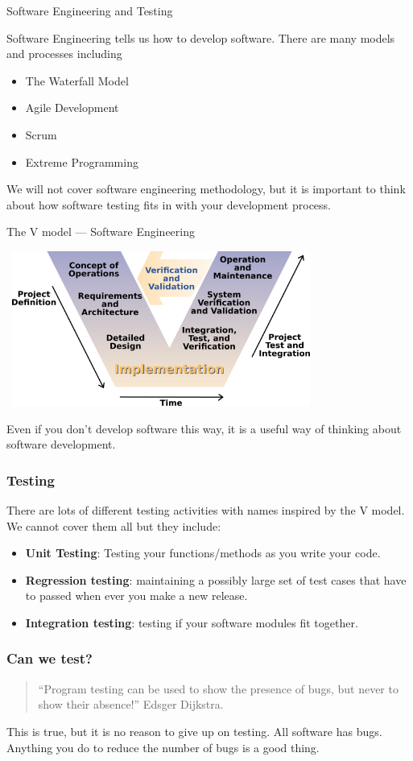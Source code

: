 \documentclass{beamer}
\newcommand{\recordingpause}{
\begin{frame}{Recording Pause}
  \begin{center}
    Recording Pause
  \end{center}
\end{frame}
}
\renewcommand{\recordingpause}{}
\begin{document}
\recordingpause

\begin{frame}{Software Engineering and Testing}

Software Engineering tells us how to develop software. There are many
models and processes including
\begin{itemize}
\item The Waterfall Model
\item Agile Development
\item Scrum
\item Extreme Programming 
\end{itemize}
 We will not cover software engineering methodology, but it is
 important to think about how software testing fits in with your
 development process. 
\end{frame}
\begin{frame}{The V model --- Software Engineering}

\begin{center} 
 \includegraphics[height=2in,width=4in]{V_model.png}
\end{center}
Even if you don't develop software this way, it is a useful way of
thinking about software development.
\end{frame}

\begin{frame}
  \frametitle{Testing}

  There are lots of different testing activities with names inspired
  by the V model.  We cannot cover them all but they include:
  \begin{itemize}
  \item \textbf{Unit Testing}: Testing your functions/methods as you write your
    code.
  \item \textbf{Regression testing}: maintaining a possibly large set of test
    cases that have to passed when ever you make a new release.
  \item \textbf{Integration testing}: testing  if your software modules fit
    together. 
  \end{itemize}
\end{frame}
\begin{frame}
  \frametitle{Can we test?}
  
  \begin{quote}
    ``Program testing can be used to show the presence of bugs, but
    never to show their absence!'' Edsger Dijkstra.
  \end{quote}


This is true, but it is no reason to give up on testing. All software has
bugs. Anything you do to reduce the number of bugs is a good thing.
\end{frame}
\end{document}
